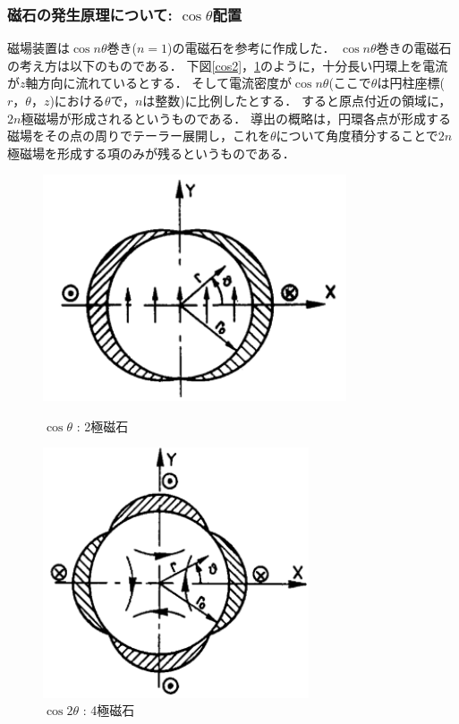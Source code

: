 \subsubsection{磁石の発生原理について: $\cos \theta$配置}
磁場装置は$\cos n\theta$巻き($n=1$)の電磁石を参考に作成した．
$\cos n \theta$巻きの電磁石の考え方は以下のものである．
下図\ref{cos2}，\ref{cos4}のように，十分長い円環上を電流が$z$軸方向に流れているとする．
そして電流密度が$\cos n\theta$(ここで$\theta$は円柱座標($r，\theta，z$)における$\theta$で，$n$は整数)に比例したとする．
すると原点付近の領域に， $2n$極磁場が形成されるというものである．
導出の概略は，円環各点が形成する磁場をその点の周りでテーラー展開し，これを$\theta$について角度積分することで$2n$極磁場を形成する項のみが残るというものである．

\begin{figure}[H]
  \begin{minipage}{0.45\hsize}
    \begin{center}
      \includegraphics[width=0.8\textwidth]{figure/tajima/cos.png}
    \end{center}
    \caption{$\cos\theta$ : 2極磁石}
    \label{cos2}
  \end{minipage}
  \hfill
  \begin{minipage}{0.45\hsize}
    \begin{center}
      \includegraphics[width=0.7\textwidth]{figure/tajima/cos2.png}
    \end{center}
    \caption{$\cos2\theta$ : 4極磁石}
    \label{cos4}
  \end{minipage}
\end{figure}
